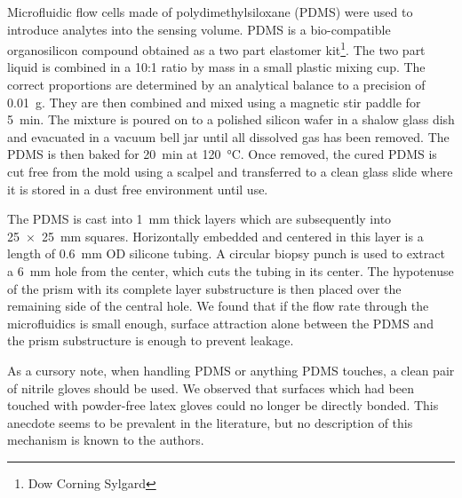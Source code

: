 Microfluidic flow cells made of polydimethylsiloxane (PDMS) were used to
introduce analytes into the sensing volume.  PDMS is a bio-compatible
organosilicon compound obtained as a two part elastomer kit\footnote{Dow
Corning Sylgard}.  The two part liquid is combined in a
10:1 ratio by mass in a small plastic mixing cup.  The correct proportions
are determined by an analytical balance to a precision of \SI{0.01}{\gram}.
They are then combined and mixed using a magnetic stir paddle for
\SI{5}{\minute}.  The mixture is poured on to a polished silicon wafer in a
shalow glass dish and evacuated in a vacuum bell jar until all dissolved
gas has been removed.  The PDMS is then baked for \SI{20}{\minute} at
\SI{120}{\celsius}.  Once removed, the cured PDMS is cut free from the mold
using a scalpel and transferred to a clean glass slide where it is stored
in a dust free environment until use.

The PDMS is cast into \SI{1}{\milli\meter} thick layers which are
subsequently into \SI{25x25}{\milli\meter} squares.  Horizontally embedded
and centered in this layer is a length of \SI{0.6}{\milli\meter} OD
silicone tubing.  A circular biopsy punch is used to extract a
\SI{6}{\milli\meter} hole from the center, which cuts the tubing in its
center.  The hypotenuse of the prism with its complete layer substructure
is then placed over the remaining side of the central hole.  We found that
if the flow rate through the microfluidics is small enough, surface
attraction alone between the PDMS and the prism substructure is enough to
prevent leakage.

As a cursory note, when handling PDMS or anything PDMS touches, a clean
pair of nitrile gloves should be used.  We observed that surfaces which had
been touched with powder-free latex gloves could no longer be directly
bonded.  This anecdote seems to be prevalent in the literature, but no
description of this mechanism is known to the authors.
